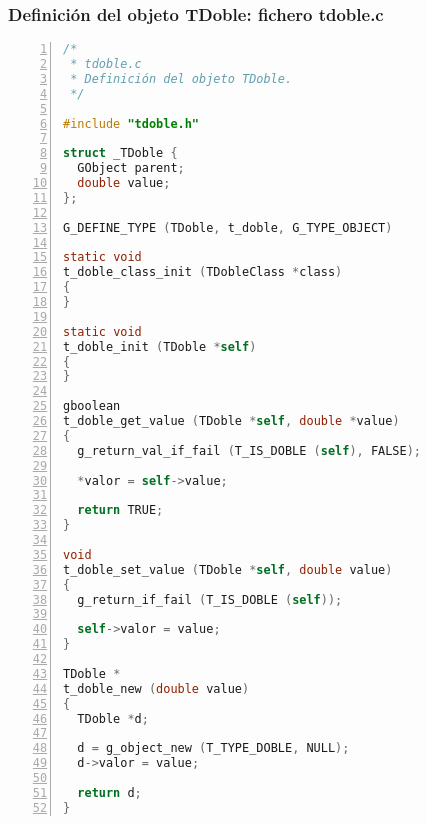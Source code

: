 \subsubsection{Definición del objeto \textsf{TDoble}: fichero \textsf{tdoble.c}}

\begin{lstlisting}[language=C, numbers=left]
/*
 * tdoble.c
 * Definición del objeto TDoble.
 */
 
#include "tdoble.h"

struct _TDoble {
  GObject parent;
  double value;
};

G_DEFINE_TYPE (TDoble, t_doble, G_TYPE_OBJECT)

static void
t_doble_class_init (TDobleClass *class)
{
}

static void
t_doble_init (TDoble *self)
{
}

gboolean
t_doble_get_value (TDoble *self, double *value)
{
  g_return_val_if_fail (T_IS_DOBLE (self), FALSE);

  *valor = self->value;
  
  return TRUE;
}

void
t_doble_set_value (TDoble *self, double value)
{
  g_return_if_fail (T_IS_DOBLE (self));

  self->valor = value;
}

TDoble *
t_doble_new (double value)
{
  TDoble *d;

  d = g_object_new (T_TYPE_DOBLE, NULL);
  d->valor = value;
  
  return d;
}
 \end{lstlisting}

